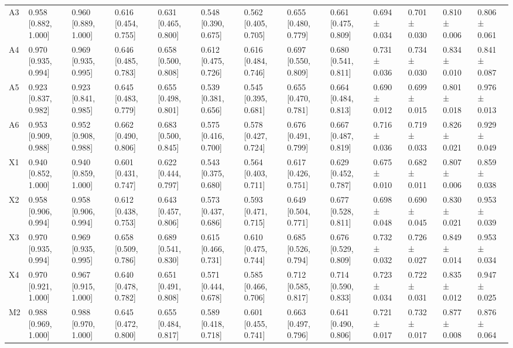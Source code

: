 \begin{table}
\begin{tabular}{lllllllllllll}
A3 & 0.958 [0.882, 1.000] & 0.960 [0.889, 1.000] & 0.616 [0.454, 0.755] & 0.631 [0.465, 0.800] & 0.548 [0.390, 0.675] & 0.562 [0.405, 0.705] & 0.655 [0.480, 0.779] & 0.661 [0.475, 0.809] & 0.694 ± 0.034 & 0.701 ± 0.030 & 0.810 ± 0.006 & 0.806 ± 0.061 \\
A4 & 0.970 [0.935, 0.994] & 0.969 [0.935, 0.995] & 0.646 [0.485, 0.783] & 0.658 [0.500, 0.808] & 0.612 [0.475, 0.726] & 0.616 [0.484, 0.746] & 0.697 [0.550, 0.809] & 0.680 [0.541, 0.811] & 0.731 ± 0.036 & 0.734 ± 0.030 & 0.834 ± 0.010 & 0.841 ± 0.087 \\
A5 & 0.923 [0.837, 0.982] & 0.923 [0.841, 0.985] & 0.645 [0.483, 0.779] & 0.655 [0.498, 0.801] & 0.539 [0.381, 0.656] & 0.545 [0.395, 0.681] & 0.655 [0.470, 0.781] & 0.664 [0.484, 0.813] & 0.690 ± 0.012 & 0.699 ± 0.015 & 0.801 ± 0.018 & 0.976 ± 0.013 \\
A6 & 0.953 [0.909, 0.988] & 0.952 [0.908, 0.988] & 0.662 [0.490, 0.806] & 0.683 [0.500, 0.845] & 0.575 [0.416, 0.700] & 0.578 [0.427, 0.724] & 0.676 [0.491, 0.799] & 0.667 [0.487, 0.819] & 0.716 ± 0.036 & 0.719 ± 0.033 & 0.826 ± 0.021 & 0.929 ± 0.049 \\
X1 & 0.940 [0.852, 1.000] & 0.940 [0.859, 1.000] & 0.601 [0.431, 0.747] & 0.622 [0.444, 0.797] & 0.543 [0.375, 0.680] & 0.564 [0.403, 0.711] & 0.617 [0.426, 0.751] & 0.629 [0.452, 0.787] & 0.675 ± 0.010 & 0.682 ± 0.011 & 0.807 ± 0.006 & 0.859 ± 0.038 \\
X2 & 0.958 [0.906, 0.994] & 0.958 [0.906, 0.994] & 0.612 [0.438, 0.753] & 0.643 [0.457, 0.806] & 0.573 [0.437, 0.686] & 0.593 [0.471, 0.715] & 0.649 [0.504, 0.771] & 0.677 [0.528, 0.811] & 0.698 ± 0.048 & 0.690 ± 0.045 & 0.830 ± 0.021 & 0.953 ± 0.039 \\
X3 & 0.970 [0.935, 0.994] & 0.969 [0.935, 0.995] & 0.658 [0.509, 0.786] & 0.689 [0.541, 0.830] & 0.615 [0.466, 0.731] & 0.610 [0.475, 0.744] & 0.685 [0.526, 0.794] & 0.676 [0.529, 0.809] & 0.732 ± 0.032 & 0.726 ± 0.027 & 0.849 ± 0.014 & 0.953 ± 0.034 \\
X4 & 0.970 [0.921, 1.000] & 0.967 [0.915, 1.000] & 0.640 [0.478, 0.782] & 0.651 [0.491, 0.808] & 0.571 [0.444, 0.678] & 0.585 [0.466, 0.706] & 0.712 [0.585, 0.817] & 0.714 [0.590, 0.833] & 0.723 ± 0.034 & 0.722 ± 0.031 & 0.835 ± 0.012 & 0.947 ± 0.025 \\
M2 & 0.988 [0.969, 1.000] & 0.988 [0.970, 1.000] & 0.645 [0.472, 0.800] & 0.655 [0.484, 0.817] & 0.589 [0.418, 0.718] & 0.601 [0.455, 0.741] & 0.663 [0.497, 0.796] & 0.641 [0.490, 0.806] & 0.721 ± 0.017 & 0.732 ± 0.017 & 0.877 ± 0.008 & 0.876 ± 0.064 \\

\end{tabular}
\end{table}
